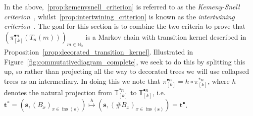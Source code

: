 \documentclass[a4paper, final]{amsart}
\theoremstyle{plain}
\theoremstyle{definition}
\newcommand{\tree}[1][t]{\boldsymbol{#1}}
\newcommand{\T}{\mathbb{T}}
\DeclareMathOperator{\insertable}{ins}
\newcommand{\insertablef}[1][\tree]{\insertable({\tree[#1]})}
\newcommand{\N}{\mathbb{N}}
\begin{document}
%
In the above,~\ref{prop:kemenysnell_criterion} is referred to as the \textit{Kemeny-Snell criterion}~\cite{MR0115196}, whilst~\ref{prop:intertwining_criterion} is known as the \textit{intertwining criterion}~\cite{MR624684}.
The goal for this section is to combine the two criteria to prove that ${\left( \pi_{[k]}^{\bullet n} \left( T_n(m) \right) \right)}_{m \in \N_0}$ is a Markov chain with transition kernel described in Proposition~\ref{prop:decorated_transition_kernel}.
Illustrated in Figure~\ref{fig:commutativediagram_complete}, we seek to do this by splitting this up, so rather than projecting all the way to decorated trees we will use collapsed trees as an intermediary.
In doing this we note that $\pi_{[k]}^{\bullet n} = h \circ \pi_{[k]}^{* n}$, where $h$ denotes the natural projection from $\T_{[k]}^{* n}$ to $\T_{[k]}^{\bullet n}$, i.e.\ $\tree^* = \left( \tree[s], {\left( B_x \right)}_{x \in \insertablef[s]} \right) \stackrel{h}{\mapsto} \left( \tree[s], {\left( \# B_x \right)}_{x \in \insertablef[s]} \right) = \tree^\bullet$.
\end{document}
